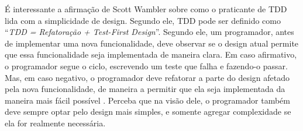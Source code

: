 É interessante a afirmação de Scott Wambler sobre como o praticante de TDD lida
com a simplicidade de design. Segundo ele, TDD pode ser definido como
``\textit{TDD = Refatoração + Test-First Design}''. Segundo ele, um programador,
antes de implementar uma nova funcionalidade, deve observar se o design atual
permite que essa funcionalidade seja implementada de maneira clara. Em caso
afirmativo, o programador segue o ciclo, escrevendo um teste que falha e
fazendo-o passar. Mas, em caso negativo, o programador deve refatorar a parte do
design afetado pela nova funcionalidade, de maneira a permitir que ela seja
implementada da maneira mais fácil possível \cite{wambler-tdd}. Perceba que na
visão dele, o programador também deve sempre optar pelo design mais simples, e
somente agregar complexidade se ela for realmente necessária.

